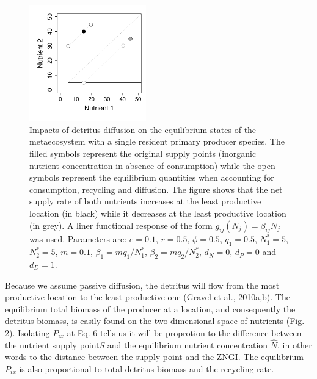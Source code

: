 \documentclass[letterpaper,twocolumn,showkeys]{revtex4-1}
\begin{document}
\begin{figure}[tb]
   \centering
   \includegraphics[width=0.45\textwidth]{DetritusDiffusion.pdf}
   \caption{Impacts of detritus diffusion on the equilibrium states of the metaecosystem with a single resident primary producer species. The filled symbols represent the original supply points (inorganic nutrient concentration in absence of consumption) while the open symbols represent the equilibrium quantities when accounting for consumption, recycling and diffusion. The figure shows that the net supply rate of both nutrients increases at the least productive location (in black) while it decreases at the least productive location (in grey). A liner functional response of the form $g_{ij}(N_{j}) = \beta_{ij}N_j$ was used. Parameters are: $e=0.1$, $r= 0.5$, $\phi=0.5$, $q_1 = 0.5$, $N^*_1=5$, $N^*_2=5$, $m =0.1$, $\beta_1 = mq_1/N^*_1$, $\beta_2 = mq_2/N^*_2$, $d_N = 0$, $d_P = 0$ and $d_D = 1$.
}
   \label{f:Detritus}
\end{figure}

Because we assume passive diffusion, the detritus will flow from the most productive location to the least productive one (Gravel et al., 2010a,b). The equilibrium total biomass of the producer at a location, and consequently the detritus biomass, is easily found on the two-dimensional space of nutrients (Fig. 2). Isolating $P_{ix}$ at Eq. 6 tells us it will be proprotion to the difference between the nutrient supply point$S$ and the equilibrium nutrient concentration $\widehat{N}$, in other words to the distance between the supply point and the ZNGI. The equilibrium $P_{ix}$ is also proportional to total detritus biomass and the recycling rate. 
\end{document}
